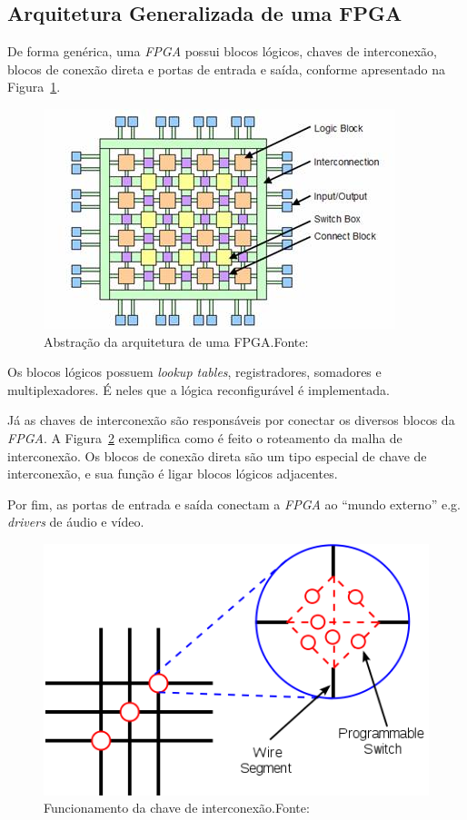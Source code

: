     \subsection{Arquitetura Generalizada de uma FPGA}
    { De forma genérica, uma \textit{FPGA} possui blocos lógicos, chaves de
        interconexão, blocos de conexão direta e portas de entrada e saída,
        conforme apresentado na Figura~\ref{fig:fpga_general_arch}.
    }

    \begin{figure}[H]
    \centering
    \includegraphics[width=.7\linewidth]
        {../images/fpga_architecture_abstraction_-_olin_college.jpg}
        \caption[Abstração da arquitetura de uma FPGA]
            {Abstração da arquitetura de uma FPGA.\quad Fonte:~\cite{fpga_arch_abstraction}}
        \label{fig:fpga_general_arch}
    \end{figure}

    { Os blocos lógicos possuem \textit{lookup tables}, registradores, somadores
        e multiplexadores. É neles que a lógica reconfigurável é implementada.
    }

    { Já as chaves de interconexão são responsáveis por conectar os diversos
        blocos da \textit{FPGA}. A Figura~\ref{fig:fpga_switch_box} exemplifica
        como é feito o roteamento da malha de interconexão. Os blocos de conexão
        direta são um tipo especial de chave de interconexão, e sua função é ligar
        blocos lógicos adjacentes.
    }

    { Por fim, as portas de entrada e saída conectam a \textit{FPGA} ao ``mundo
        externo'' e.g. \textit{drivers} de áudio e vídeo.
    }

    \begin{figure}[H]
    \centering
    \includegraphics[width=.5\linewidth]
        {../images/switch_box_wikimedia.png}
        \caption[Funcionamento da chave de interconexão]
            {Funcionamento da chave de interconexão.\quad Fonte:~\cite{fpga_switch_box}}
        \label{fig:fpga_switch_box}
    \end{figure}


